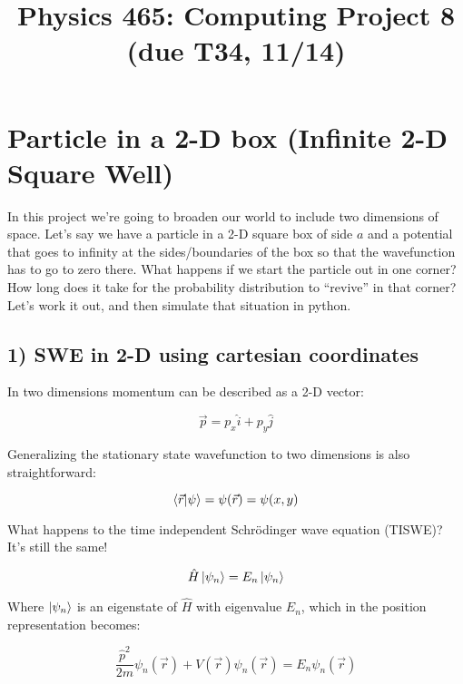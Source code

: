 \documentclass[11pt]{article} %
\title{Physics 465: Computing Project 8 (due T34, 11/14)}
\begin{document}
\maketitle

\section*{Particle in a 2-D box (Infinite 2-D Square Well)}

In this project we're going to broaden our world to include two dimensions of space. Let's say we have a particle in a 2-D square box of side $a$ and a potential that goes to infinity at the sides/boundaries of the box so that the wavefunction has to go to zero there. What happens if we start the particle out in one corner? How long does it take for the probability distribution to ``revive'' in that corner? Let's work it out, and then simulate that situation in python.

\subsection*{1) SWE in 2-D using cartesian coordinates}

In two dimensions momentum can be described as a 2-D vector:

\begin{equation}
\vec{p} = p_x\hat{i} + p_y\hat{j}
\end{equation}

Generalizing the stationary state wavefunction to two dimensions is also straightforward: 

\begin{equation}
\braket{\vec{r}|\psi} = \psi(\vec{r}) = \psi(x, y)
\end{equation}

What happens to the time independent Schr\"odinger wave equation (TISWE)? It's still the same!

\begin{equation}
\hat{H}\ket{\psi_n} = E_n \ket{\psi_n}
\end{equation}

Where $\ket{\psi_n}$ is an eigenstate of $\hat{H}$ with eigenvalue $E_n$, which in the position representation becomes:

\begin{equation}
\frac{\hat{p}^2}{2m}\psi_n(\vec{r}) + V(\vec{r})\psi_n(\vec{r}) = E_n \psi_n(\vec{r})
\label{eq:TISE}
\end{equation}
\end{document}
